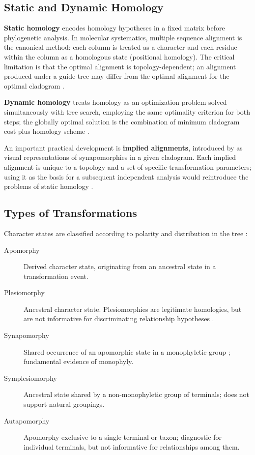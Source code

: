\subsection{Static and Dynamic Homology}

\textbf{Static homology} encodes homology hypotheses in a fixed matrix before phylogenetic analysis. In molecular systematics, multiple sequence alignment is the canonical method: each column is treated as a character and each residue within the column as a homologous state (positional homology). The critical limitation is that the optimal alignment is topology-dependent; an alignment produced under a guide tree may differ from the optimal alignment for the optimal cladogram \parencite{wheeleretal2006}.

\textbf{Dynamic homology} treats homology as an optimization problem solved simultaneously with tree search, employing the same optimality criterion for both steps; the globally optimal solution is the combination of minimum cladogram cost plus homology scheme \parencite{wheeleretal2006}.

An important practical development is \textbf{implied alignments}, introduced by \textcite{wheeler2003a} as visual representations of synapomorphies in a given cladogram. Each implied alignment is unique to a topology and a set of specific transformation parameters; using it as the basis for a subsequent independent analysis would reintroduce the problems of static homology \parencite{wheeleretal2006}.

\subsection{Types of Transformations}

Character states are classified according to polarity and distribution in the tree \parencite{hennig1966,schuh2009}:

\begin{description}
    \item[Apomorphy] Derived character state, originating from an ancestral state in a transformation event.
    \item[Plesiomorphy] Ancestral character state. Plesiomorphies are legitimate homologies, but are not informative for discriminating relationship hypotheses \parencite{nixon2012}.
    \item[Synapomorphy] Shared occurrence of an apomorphic state in a monophyletic group \parencite{grant2004a}; fundamental evidence of monophyly.
    \item[Symplesiomorphy] Ancestral state shared by a non-monophyletic group of terminals; does not support natural groupings.
    \item[Autapomorphy] Apomorphy exclusive to a single terminal or taxon; diagnostic for individual terminals, but not informative for relationships among them.
\end{description}

